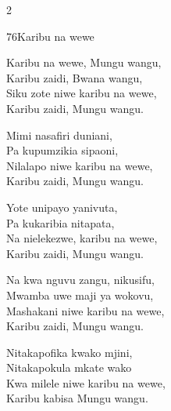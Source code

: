 \documentclass{article}
\begin{document}
\begin{multicols}{2}
\begin{hymn}{76}{Karibu na wewe}{}
\begin{stanza}
Karibu na wewe, Mungu wangu,\\
Karibu zaidi, Bwana wangu,\\
Siku zote niwe karibu na wewe,\\
Karibu zaidi, Mungu wangu.
\end{stanza}
\begin{stanza}
Mimi nasafiri duniani,\\
Pa kupumzikia sipaoni,\\
Nilalapo niwe karibu na wewe,\\
Karibu zaidi, Mungu wangu.
\end{stanza}
\begin{stanza}
Yote unipayo yanivuta,\\
Pa kukaribia nitapata,\\
Na nielekezwe, karibu na wewe,\\
Karibu zaidi, Mungu wangu.
\end{stanza}
\begin{stanza}
Na kwa nguvu zangu, nikusifu,\\
Mwamba uwe maji ya wokovu,\\
Mashakani niwe karibu na wewe,\\
Karibu zaidi, Mungu wangu.
\end{stanza}
\begin{stanza}
Nitakapofika kwako mjini,\\
Nitakapokula mkate wako\\
Kwa milele niwe karibu na wewe,\\
Karibu kabisa Mungu wangu.
\end{stanza}
\end{hymn}


\end{multicols}
\end{document}

